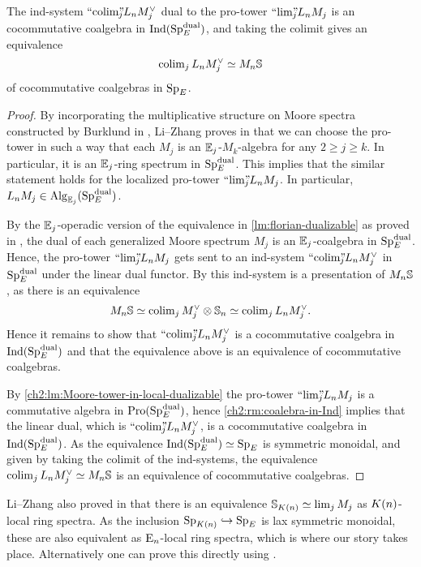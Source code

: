 \begin{lemma}
    \label{ch2:lm:coalgebra-ind-presentation-of-monochromatic-sphere}
    The ind-system $\indcolim L_n M_j^\vee$ dual to the pro-tower $\prolim L_n M_j$ is an cocommutative coalgebra in $\Ind(\SpE\dual)$, and taking the colimit gives an equivalence 
    \[\colim_j L_n M_j^\vee \simeq M_n\S\] 
    of cocommutative coalgebras in $\SpE$. 
\end{lemma}
\begin{proof}
    By incorporating the multiplicative structure on Moore spectra constructed by Burklund in \cite{burklund_2022}, Li--Zhang proves in \cite[2.1.4]{li-zhang_2023} that we can choose the pro-tower in such a way that each $M_j$ is an $\E_j$-$M_k$-algebra for any $2\geq j \geq k$. In particular, it is an $\E_j$-ring spectrum in $\SpE\dual$. This implies that the similar statement holds for the localized pro-tower $\prolim L_n M_j$. In particular, $L_n M_j \in \Alg_{\E_j}(\SpE\dual)$. 
    
    By the $\E_j$-operadic version of the equivalence in \cref{lm:florian-dualizable} as proved in \cite[2.21]{peroux_2022}, the dual of each generalized Moore spectrum $M_j$ is an $\E_j$-coalgebra in $\SpE\dual$. Hence, the pro-tower $\prolim L_n M_j$ gets sent to an ind-system $\indcolim L_n M_j^\vee$ in $\SpE\dual$ under the linear dual functor. By \cite[7.10(c)]{hovey-strickland_99} this ind-system is a presentation of $M_n\S$, as there is an equivalence 
    \[M_n \S \simeq \colim_j M_j^\vee \otimes \S_n \simeq \colim_j L_n M_j^\vee.\]
    Hence it remains to show that $\indcolim L_n M_j^\vee$ is a cocommutative coalgebra in $\Ind(\SpE\dual)$ and that the equivalence above is an equivalence of cocommutative coalgebras. 

    By \cref{ch2:lm:Moore-tower-in-local-dualizable} the pro-tower $\prolim L_n M_j$ is a commutative algebra in $\Pro(\SpE\dual)$, hence \cref{ch2:rm:coalebra-in-Ind} implies that the linear dual, which is $\indcolim L_n M_j^\vee$, is a cocommutative coalgebra in $\Ind(\SpE\dual)$. As the equivalence $\Ind(\SpE\dual)\simeq \SpE$ is symmetric monoidal, and given by taking the colimit of the ind-systems, the equivalence $\colim_j L_n M_j^\vee \simeq M_n \S$ is an equivalence of cocommutative coalgebras.  
\end{proof}

\begin{remark}
    Li--Zhang also proved in \cite[2.1.5]{li-zhang_2023} that there is an equivalence $\S_{\Kn} \simeq \lim_j M_j$ as $\Kn$-local ring spectra. As the inclusion $\SpKn\hookrightarrow \SpE$ is lax symmetric monoidal, these are also equivalent as $\En$-local ring spectra, which is where our story takes place. Alternatively one can prove this directly using \cite[2.1.6]{li-zhang_2023}. 
\end{remark}

